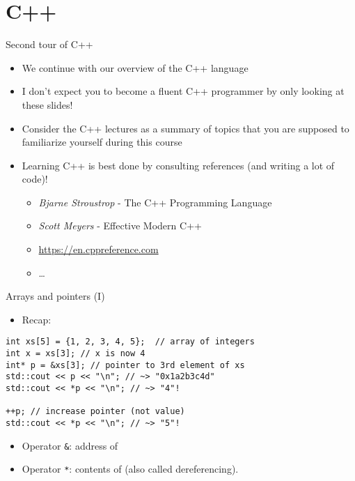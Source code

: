 \documentclass[10pt]{beamer}
\begin{document}
\section{C++}
\label{sec:org73576f0}
\begin{frame}[label={sec:orgbbfdf2d}]{Second tour of C++}
\begin{itemize}
\item We continue with our overview of the C++ language
\item I don't expect you to become a fluent C++ programmer by only looking at these
slides!
\item Consider the C++ lectures as a \alert{summary of topics} that you are supposed to
familiarize yourself during this course
\item Learning C++ is best done by consulting references (and writing a lot of
code)!
\begin{itemize}
\item \emph{Bjarne Stroustrop} - The C++ Programming Language
\item \emph{Scott Meyers} - Effective Modern C++
\item \url{https://en.cppreference.com}
\item \ldots{}
\end{itemize}
\end{itemize}
\end{frame}
\begin{frame}[fragile,label={sec:org7350acd}]{Arrays and pointers (I)}
 \begin{itemize}
\item Recap:
\end{itemize}

\begin{verbatim}
int xs[5] = {1, 2, 3, 4, 5};  // array of integers 
int x = xs[3]; // x is now 4
int* p = &xs[3]; // pointer to 3rd element of xs
std::cout << p << "\n"; // ~> "0x1a2b3c4d"
std::cout << *p << "\n"; // ~> "4"!

++p; // increase pointer (not value)
std::cout << *p << "\n"; // ~> "5"!
\end{verbatim}

\begin{itemize}
\item Operator \texttt{\&}: \alert{address of}
\item Operator \texttt{*}: \alert{contents of} (also called dereferencing).
\end{itemize}
\end{frame}
\end{document}

